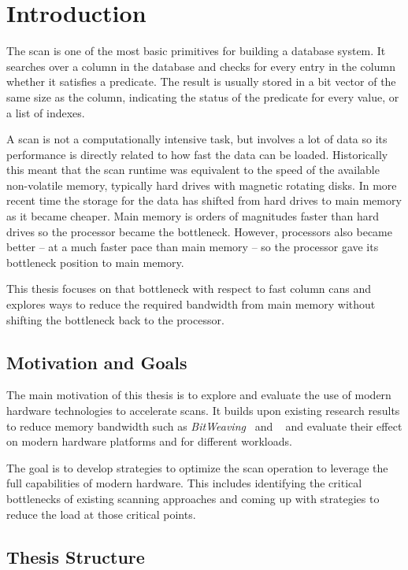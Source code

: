 \chapter{Introduction}

The scan is one of the most basic primitives for building a database system. It
searches over a column in the database and checks for every entry in the column
whether it satisfies a predicate. The result is usually stored in a bit vector
of the same size as the column, indicating the status of the predicate for
every value, or a list of indexes.

A scan is not a computationally intensive task, but involves a lot of data so
its performance is directly related to how fast the data can be loaded.
Historically this meant that the scan runtime was equivalent to the speed of
the available non-volatile memory, typically hard drives with magnetic rotating
disks. In more recent time the storage for the data has shifted from hard
drives to main memory as it became cheaper. Main memory is orders of magnitudes
faster than hard drives so the processor became the bottleneck. However,
processors also became better -- at a much faster pace than main memory --
so the processor gave its bottleneck position to main memory.

This thesis focuses on that bottleneck with respect to fast column cans and
explores ways to reduce the required bandwidth from main memory without shifting
the bottleneck back to the processor.

\section{Motivation and Goals}

The main motivation of this thesis is to explore and evaluate the use of modern
hardware technologies to accelerate scans. It builds upon existing research
results to reduce memory bandwidth such as \emph{BitWeaving}~\cite{BitWeaving}
and \simdscan{}~\cite{SIMD-Scan} and evaluate their effect on modern hardware
platforms and for different workloads.

The goal is to develop strategies to optimize the scan operation to leverage
the full capabilities of modern hardware. This includes identifying the
critical bottlenecks of existing scanning approaches and coming up with
strategies to reduce the load at those critical points.

\section{Thesis Structure}

